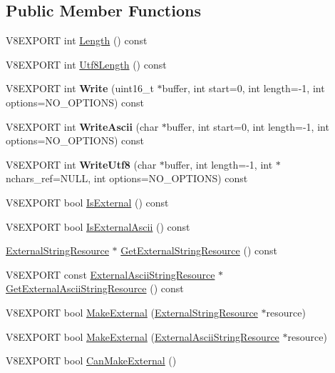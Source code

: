 \subsection*{Public Member Functions}
\begin{DoxyCompactItemize}
\item 
V8\+E\+X\+P\+O\+R\+T int \hyperlink{classv8_1_1_string_a812edd5c3beffb3a08ff94103ac31f23}{Length} () const 
\item 
V8\+E\+X\+P\+O\+R\+T int \hyperlink{classv8_1_1_string_a11d12cdcd49afe5a8bb12646fd8ec17a}{Utf8\+Length} () const 
\item 
\hypertarget{classv8_1_1_string_acb1144b0652bc44345bf2d52b1455c05}{}V8\+E\+X\+P\+O\+R\+T int {\bfseries Write} (uint16\+\_\+t $\ast$buffer, int start=0, int length=-\/1, int options=N\+O\+\_\+\+O\+P\+T\+I\+O\+N\+S) const \label{classv8_1_1_string_acb1144b0652bc44345bf2d52b1455c05}

\item 
\hypertarget{classv8_1_1_string_af60c183b13ca1caebc7ea5d4bde593e6}{}V8\+E\+X\+P\+O\+R\+T int {\bfseries Write\+Ascii} (char $\ast$buffer, int start=0, int length=-\/1, int options=N\+O\+\_\+\+O\+P\+T\+I\+O\+N\+S) const \label{classv8_1_1_string_af60c183b13ca1caebc7ea5d4bde593e6}

\item 
\hypertarget{classv8_1_1_string_ae8dca2507fe29952310f6ed65bcb58a4}{}V8\+E\+X\+P\+O\+R\+T int {\bfseries Write\+Utf8} (char $\ast$buffer, int length=-\/1, int $\ast$nchars\+\_\+ref=N\+U\+L\+L, int options=N\+O\+\_\+\+O\+P\+T\+I\+O\+N\+S) const \label{classv8_1_1_string_ae8dca2507fe29952310f6ed65bcb58a4}

\item 
V8\+E\+X\+P\+O\+R\+T bool \hyperlink{classv8_1_1_string_a945ba040efb2bffb14c04eda492767ac}{Is\+External} () const 
\item 
V8\+E\+X\+P\+O\+R\+T bool \hyperlink{classv8_1_1_string_a1b136ebc0ac30df9357e09b5486ca0a3}{Is\+External\+Ascii} () const 
\item 
\hyperlink{classv8_1_1_string_1_1_external_string_resource}{External\+String\+Resource} $\ast$ \hyperlink{classv8_1_1_string_a1a78c6fe39dbdd6322ca576e224f0cba}{Get\+External\+String\+Resource} () const 
\item 
V8\+E\+X\+P\+O\+R\+T const \hyperlink{classv8_1_1_string_1_1_external_ascii_string_resource}{External\+Ascii\+String\+Resource} $\ast$ \hyperlink{classv8_1_1_string_a0156221ab1c700883897e9d3cf129017}{Get\+External\+Ascii\+String\+Resource} () const 
\item 
V8\+E\+X\+P\+O\+R\+T bool \hyperlink{classv8_1_1_string_a6419e6b87e73bf03e326dd862fdca495}{Make\+External} (\hyperlink{classv8_1_1_string_1_1_external_string_resource}{External\+String\+Resource} $\ast$resource)
\item 
V8\+E\+X\+P\+O\+R\+T bool \hyperlink{classv8_1_1_string_ad1970efe9119a63f667c4acbdccda424}{Make\+External} (\hyperlink{classv8_1_1_string_1_1_external_ascii_string_resource}{External\+Ascii\+String\+Resource} $\ast$resource)
\item 
V8\+E\+X\+P\+O\+R\+T bool \hyperlink{classv8_1_1_string_ac24779f37e73d8af36092cca294804c3}{Can\+Make\+External} ()
\end{DoxyCompactItemize}
